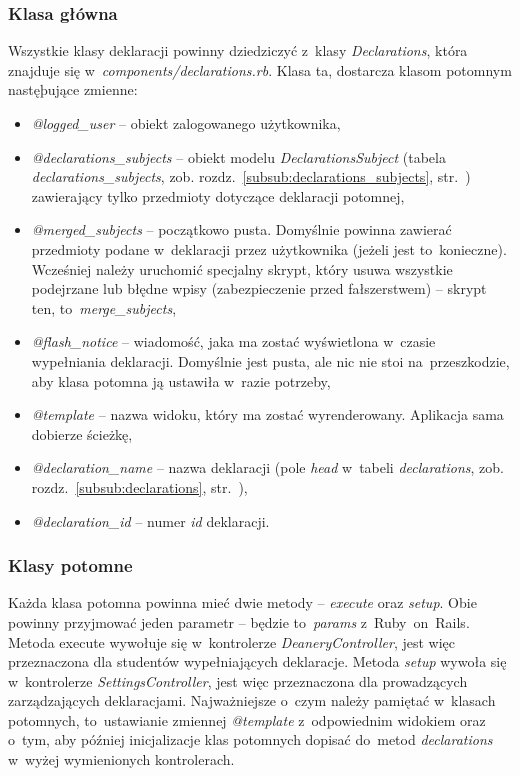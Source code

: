\documentclass[a4paper,12pt,oneside]{report}
\begin{document}
\subsubsection{Klasa główna}
Wszystkie klasy deklaracji powinny dziedziczyć z~klasy \emph{Declarations}, która znajduje się w~\emph{components/declarations.rb}. Klasa ta, dostarcza klasom potomnym nastęþujące zmienne:
\begin{itemize}
  \item \emph{@logged\_user} -- obiekt zalogowanego użytkownika,
  \item \emph{@declarations\_subjects} -- obiekt modelu \emph{DeclarationsSubject} (tabela \emph{declarations\_subjects}, zob. rozdz.~\ref{subsub:declarations_subjects}, str.~\pageref{subsub:declarations_subjects}) zawierający tylko przedmioty dotyczące deklaracji potomnej,
  \item \emph{@merged\_subjects} -- początkowo pusta. Domyślnie powinna zawierać przedmioty podane w~deklaracji przez użytkownika (jeżeli jest to~konieczne). Wcześniej należy uruchomić specjalny skrypt, który usuwa wszystkie podejrzane lub błędne wpisy (zabezpieczenie przed fałszerstwem) -- skrypt ten, to~\emph{merge\_subjects},
  \item \emph{@flash\_notice} -- wiadomość, jaka ma zostać wyświetlona w~czasie wypełniania deklaracji. Domyślnie jest pusta, ale nic nie stoi na~przeszkodzie, aby klasa potomna ją ustawiła w~razie potrzeby,
  \item \emph{@template} -- nazwa widoku, który ma zostać wyrenderowany. Aplikacja sama dobierze ścieżkę,
  \item \emph{@declaration\_name} -- nazwa deklaracji (pole \emph{head} w~tabeli \emph{declarations}, zob. rozdz.~\ref{subsub:declarations}, str.~\pageref{subsub:declarations}),
  \item \emph{@declaration\_id} -- numer \emph{id} deklaracji.
\end{itemize}

\subsubsection{Klasy potomne}
Każda klasa potomna powinna mieć dwie metody -- \emph{execute} oraz \emph{setup}. Obie powinny przyjmować jeden parametr -- będzie to~\emph{params} z~Ruby~on~Rails. Metoda execute wywołuje się w~kontrolerze \emph{DeaneryController}, jest więc przeznaczona dla studentów wypełniających deklaracje. Metoda \emph{setup} wywoła się w~kontrolerze \emph{SettingsController}, jest więc przeznaczona dla prowadzących zarządzających deklaracjami. Najważniejsze o~czym należy pamiętać w~klasach potomnych, to~ustawianie zmiennej \emph{@template} z~odpowiednim widokiem oraz o~tym, aby później inicjalizacje klas potomnych dopisać do~metod \emph{declarations} w~wyżej wymienionych kontrolerach.
\end{document}
